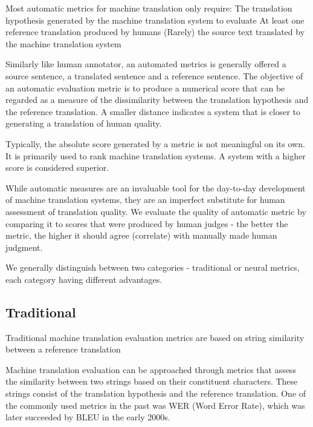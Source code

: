 Most automatic metrics for machine translation only require:
    The translation hypothesis generated by the machine translation system to evaluate
    At least one reference translation produced by humans
    (Rarely) the source text translated by the machine translation system
    

Similarly like human annotator, an automated metrics is generally offered a source sentence, a translated sentence and a reference sentence.  The  objective of an automatic evaluation metric is to produce a numerical 
score that can be regarded as a measure of the dissimilarity between the translation hypothesis and the reference translation. A smaller distance indicates a system that is closer to generating a translation of human quality.

Typically, the absolute score generated by a metric is not meaningful on its own. It is primarily used to rank machine translation systems. A system with a higher score is considered superior.

While automatic measures are an invaluable tool for the day-to-day development of machine translation systems, they are an imperfect substitute for human assessment of translation quality. We evaluate the quality of automatic metric by comparing it to scores that were produced by human judges - the better the metric, the higher it should agree (correlate) with manually made human judgment.

We generally distinguish between two categories - traditional or neural metrics, each category having different advantages.

\subsection{Traditional}
Traditional machine translation evaluation metrics are based on string similarity between a reference translation 

Machine translation evaluation can be approached through metrics that assess the similarity between two strings based on their constituent characters. These strings consist of the translation hypothesis and the reference translation. One of the commonly used metrics in the past was WER (Word Error Rate), which was later succeeded by BLEU in the early 2000s.



